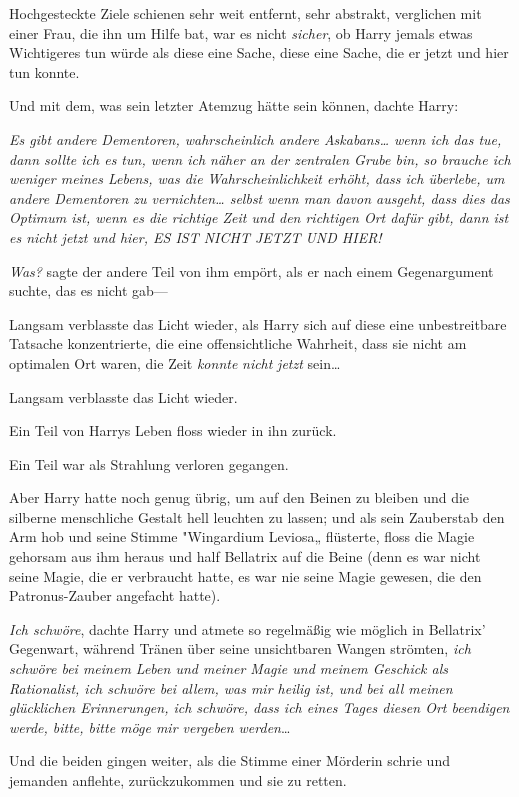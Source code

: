 {Hochgesteckte Ziele schienen sehr weit entfernt, sehr abstrakt, verglichen mit einer Frau, die ihn um Hilfe bat, war es nicht \emph{sicher}, ob Harry jemals etwas Wichtigeres tun würde als diese eine Sache, diese eine Sache, die er jetzt und hier tun konnte.

Und mit dem, was sein letzter Atemzug hätte sein können, dachte Harry:

\emph{Es gibt andere Dementoren, wahrscheinlich andere Askabans… wenn ich das tue, dann sollte ich es tun, wenn ich näher an der zentralen Grube bin, so brauche ich weniger meines Lebens, was die Wahrscheinlichkeit erhöht, dass ich überlebe, um andere Dementoren zu vernichten… selbst wenn man davon ausgeht, dass dies das Optimum ist, wenn es die richtige Zeit und den richtigen Ort dafür gibt, dann ist es nicht jetzt und hier, ES IST NICHT JETZT UND HIER!}

\emph{Was?} sagte der andere Teil von ihm empört, als er nach einem Gegenargument suchte, das es nicht gab—

Langsam verblasste das Licht wieder, als Harry sich auf diese eine unbestreitbare Tatsache konzentrierte, die eine offensichtliche Wahrheit, dass sie nicht am optimalen Ort waren, die Zeit \emph{konnte} \emph{nicht} \emph{jetzt} sein…

Langsam verblasste das Licht wieder.

Ein Teil von Harrys Leben floss wieder in ihn zurück.

Ein Teil war als Strahlung verloren gegangen.

Aber Harry hatte noch genug übrig, um auf den Beinen zu bleiben und die silberne menschliche Gestalt hell leuchten zu lassen; und als sein Zauberstab den Arm hob und seine Stimme "Wingardium Leviosa„ flüsterte, floss die Magie gehorsam aus ihm heraus und half Bellatrix auf die Beine (denn es war nicht seine Magie, die er verbraucht hatte, es war nie seine Magie gewesen, die den Patronus-Zauber angefacht hatte).

\emph{Ich schwöre}, dachte Harry und atmete so regelmäßig wie möglich in Bellatrix' Gegenwart, während Tränen über seine unsichtbaren Wangen strömten, \emph{ich schwöre bei meinem Leben und meiner Magie und meinem Geschick als Rationalist, ich schwöre bei allem, was mir heilig ist, und bei all meinen glücklichen Erinnerungen, ich schwöre, dass ich eines Tages diesen Ort beendigen werde, bitte, bitte möge mir vergeben werden}…

Und die beiden gingen weiter, als die Stimme einer Mörderin schrie und jemanden anflehte, zurückzukommen und sie zu retten.

}
